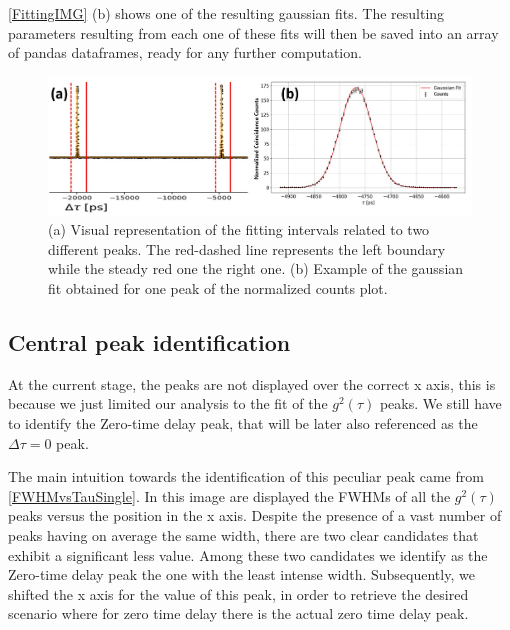 \autoref{FittingIMG} (b) shows one of the resulting gaussian fits.
The resulting parameters resulting from each one of these fits will then be saved into an array of pandas dataframes, ready for any further computation.
\begin{figure}[hbtp]
\centering
\includegraphics[width=1\textwidth]{NCountsFitting.jpg}
\caption{(a) Visual representation of the fitting intervals related to two different peaks. The red-dashed line represents the left boundary while the steady red one the right one. (b) Example of the gaussian fit obtained for one peak of the normalized counts plot.}
\label{FittingIMG}
\end{figure}

\subsection{Central peak identification}
\label{subsec:CentralPeakId}
At the current stage, the peaks are not displayed over the correct x axis, this is because we just limited our analysis to the fit of the $g^2 (\tau)$ peaks. We still have to identify the Zero-time delay peak, that will be later also referenced as the  $\Delta \tau = 0$ peak.

The main intuition towards the identification of this peculiar peak came from \autoref{FWHMvsTauSingle}.
In this image are displayed the FWHMs of all the $g^2 (\tau)$ peaks versus the position in the x axis.
Despite the presence of a vast number of peaks having on average the same width, there are two clear candidates that exhibit a significant less value.
Among these two candidates we identify as the Zero-time delay peak the one with the least intense width.
Subsequently, we shifted the x axis for the value of this peak, in order to retrieve the desired scenario where for zero time delay there is the actual zero time delay peak.

